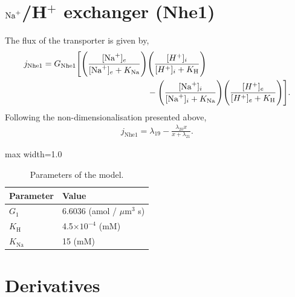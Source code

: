\documentclass{svjour3}
\newcommand{\na}{{\rm Na}^+}
\newcommand{\bna}{[{\rm Na}^+]_i}
\begin{document}
\section*{\Large $\na$/H$^+$ exchanger (Nhe1)}
The flux of the transporter is given by,
\begin{align*}
j_{\text{Nhe1}}=G_{\text{Nhe1}} \Bigg[ \Bigg( \frac{[\na]_e}{[\na]_e + K_{\text{Na}}} \Bigg)  & \Bigg( \frac{[H^+]_i}{[H^+]_i + K_{\text{H}}}\Bigg) \\
& -\Bigg( \frac{\bna}{\bna + K_{\text{Na}}}\Bigg) \Bigg( \frac{[H^+]_e  }{[H^+]_e + K_{\text{H}}}  \Bigg) \Bigg].
\end{align*}
Following the non-dimensionalisation presented above,
\begin{align}
j_{\text{Nhe1}}=\lambda_{19}-\frac{\lambda_{20} x}{x+\lambda_{21}}.
\end{align}
\begin{table}[H]
\centering
\captionsetup{justification=centering} 
\caption{Parameters of the model.}
\begin{adjustbox}{max width=1.0\textwidth}
\begin{tabular}{@{}ll@{}}
\toprule
\bf{Parameter}				& \bf{Value}										\\ \midrule
$G_1$						& 6.6036	(amol / $\mu \text{m}^3$ s)				\\
$K_{\text{H}}$ 				& 4.5$\times 10^{-4}$ 	(mM)						\\	
$K_{\text{Na}}$				& 15 (mM)										\\
\bottomrule
\end{tabular}
\end{adjustbox}
\label{table:Ae2}
\end{table}


\section*{\Large Derivatives}
\end{document}
